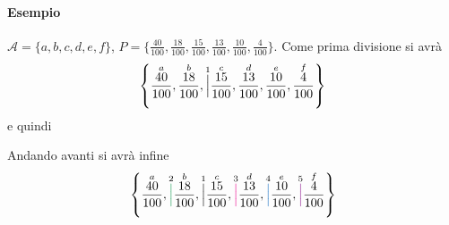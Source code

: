 \paragraph{Esempio} $\mathcal{A}=\{a,b,c,d,e,f\}$, $P=\{\frac{40}{100},\frac{18}{100},\frac{15}{100},\frac{13}{100},\frac{10}{100},\frac{4}{100}\}$. Come prima divisione si avrà
$$
    \left\{
    \overset{a}{\frac{40}{100}},
    \overset{b}{\frac{18}{100}}, \overset{1}{\textbf{\Big|}}
    \overset{c}{\frac{15}{100}},
    \overset{d}{\frac{13}{100}},
    \overset{e}{\frac{10}{100}},
    \overset{f}{\frac{4}{100}} 
    \right\}
$$
e quindi
\begin{center}
\end{center}
Andando avanti si avrà infine
$$
    \left\{
    \overset{a}{\frac{40}{100}}, \overset{2}{\textbf{\textcolor{ForestGreen}{\Big|}}}
    \overset{b}{\frac{18}{100}}, \overset{1}{\textbf{\Big|}}
    \overset{c}{\frac{15}{100}}, \overset{3}{\textbf{\textcolor{Magenta}{\Big|}}}
    \overset{d}{\frac{13}{100}}, \overset{4}{\textbf{\textcolor{RoyalBlue}{\Big|}}}
    \overset{e}{\frac{10}{100}}, \overset{5}{\textbf{\textcolor{Plum}{\Big|}}}
    \overset{f}{\frac{4}{100}} 
    \right\}
$$
